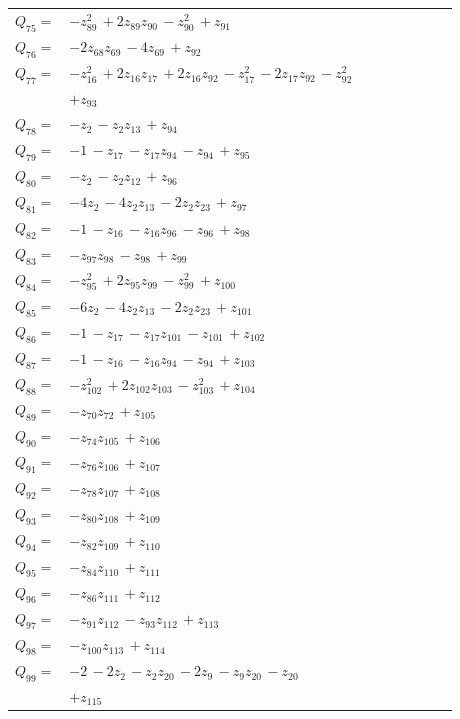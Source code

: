\begin{longtable}{@{}r p{0.88\linewidth}@{}}
$Q_{75}=$ & $-z_{89}^{2}\,+2z_{89}z_{90}\,-z_{90}^{2}\,+z_{91}$\\[5pt]
$Q_{76}=$ & $-2z_{68}z_{69}\,-4z_{69}\,+z_{92}$\\[5pt]
$Q_{77}=$ & $-z_{16}^{2}\,+2z_{16}z_{17}\,+2z_{16}z_{92}\,-z_{17}^{2}\,-2z_{17}z_{92}\,-z_{92}^{2}$\\
 & $+z_{93}$\\[5pt]
$Q_{78}=$ & $-z_{2}\,-z_{2}z_{13}\,+z_{94}$\\[5pt]
$Q_{79}=$ & $-1\,-z_{17}\,-z_{17}z_{94}\,-z_{94}\,+z_{95}$\\[5pt]
$Q_{80}=$ & $-z_{2}\,-z_{2}z_{12}\,+z_{96}$\\[5pt]
$Q_{81}=$ & $-4z_{2}\,-4z_{2}z_{13}\,-2z_{2}z_{23}\,+z_{97}$\\[5pt]
$Q_{82}=$ & $-1\,-z_{16}\,-z_{16}z_{96}\,-z_{96}\,+z_{98}$\\[5pt]
$Q_{83}=$ & $-z_{97}z_{98}\,-z_{98}\,+z_{99}$\\[5pt]
$Q_{84}=$ & $-z_{95}^{2}\,+2z_{95}z_{99}\,-z_{99}^{2}\,+z_{100}$\\[5pt]
$Q_{85}=$ & $-6z_{2}\,-4z_{2}z_{13}\,-2z_{2}z_{23}\,+z_{101}$\\[5pt]
$Q_{86}=$ & $-1\,-z_{17}\,-z_{17}z_{101}\,-z_{101}\,+z_{102}$\\[5pt]
$Q_{87}=$ & $-1\,-z_{16}\,-z_{16}z_{94}\,-z_{94}\,+z_{103}$\\[5pt]
$Q_{88}=$ & $-z_{102}^{2}\,+2z_{102}z_{103}\,-z_{103}^{2}\,+z_{104}$\\[5pt]
$Q_{89}=$ & $-z_{70}z_{72}\,+z_{105}$\\[5pt]
$Q_{90}=$ & $-z_{74}z_{105}\,+z_{106}$\\[5pt]
$Q_{91}=$ & $-z_{76}z_{106}\,+z_{107}$\\[5pt]
$Q_{92}=$ & $-z_{78}z_{107}\,+z_{108}$\\[5pt]
$Q_{93}=$ & $-z_{80}z_{108}\,+z_{109}$\\[5pt]
$Q_{94}=$ & $-z_{82}z_{109}\,+z_{110}$\\[5pt]
$Q_{95}=$ & $-z_{84}z_{110}\,+z_{111}$\\[5pt]
$Q_{96}=$ & $-z_{86}z_{111}\,+z_{112}$\\[5pt]
$Q_{97}=$ & $-z_{91}z_{112}\,-z_{93}z_{112}\,+z_{113}$\\[5pt]
$Q_{98}=$ & $-z_{100}z_{113}\,+z_{114}$\\[5pt]
$Q_{99}=$ & $-2\,-2z_{2}\,-z_{2}z_{20}\,-2z_{9}\,-z_{9}z_{20}\,-z_{20}$\\
 & $+z_{115}$\\[5pt]

\end{longtable}
